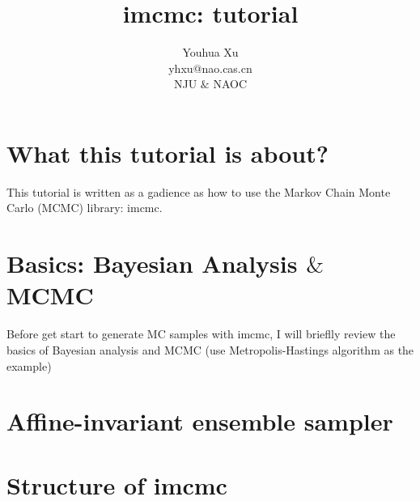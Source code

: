 \documentclass[11pt,a4paper]{article}
\title{imcmc: tutorial}
\author{Youhua Xu\\
	yhxu@nao.cas.cn\\
	NJU $\&$ NAOC}
\begin{document}
\maketitle

\section{What this tutorial is about?}
This tutorial is written as a gadience as how to use the Markov Chain Monte Carlo (MCMC) library: imcmc.

\section{Basics: Bayesian Analysis $\&$ MCMC}
Before get start to generate MC samples with imcmc, I will brieflly review the basics of Bayesian analysis and MCMC (use Metropolis-Hastings algorithm as the example)


\section{Affine-invariant ensemble sampler}

\section{Structure of \textbf{imcmc}}
	
\end{document}
